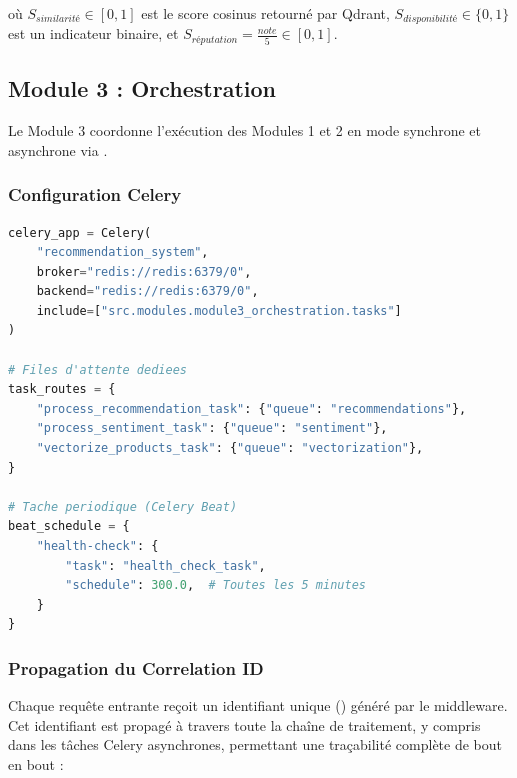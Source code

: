 où $S_{similarité} \in [0, 1]$ est le score cosinus retourné par Qdrant, $S_{disponibilité} \in \{0, 1\}$ est un indicateur binaire, et $S_{réputation} = \frac{note}{5} \in [0, 1]$.

\subsection{Module 3 : Orchestration}

Le Module 3 coordonne l'exécution des Modules 1 et 2 en mode synchrone et asynchrone via .

\subsubsection{Configuration Celery}

\begin{lstlisting}[language=Python, caption={Configuration de l'application Celery}]
celery_app = Celery(
    "recommendation_system",
    broker="redis://redis:6379/0",
    backend="redis://redis:6379/0",
    include=["src.modules.module3_orchestration.tasks"]
)

# Files d'attente dediees
task_routes = {
    "process_recommendation_task": {"queue": "recommendations"},
    "process_sentiment_task": {"queue": "sentiment"},
    "vectorize_products_task": {"queue": "vectorization"},
}

# Tache periodique (Celery Beat)
beat_schedule = {
    "health-check": {
        "task": "health_check_task",
        "schedule": 300.0,  # Toutes les 5 minutes
    }
}
\end{lstlisting}

\subsubsection{Propagation du Correlation ID}

Chaque requête entrante reçoit un identifiant unique () généré par le middleware. Cet identifiant est propagé à travers toute la chaîne de traitement, y compris dans les tâches Celery asynchrones, permettant une traçabilité complète de bout en bout :

\begin{processbox}
 \flowto\  \flowto\  \flowto\  \flowto\  \flowto\ 
\end{processbox}


